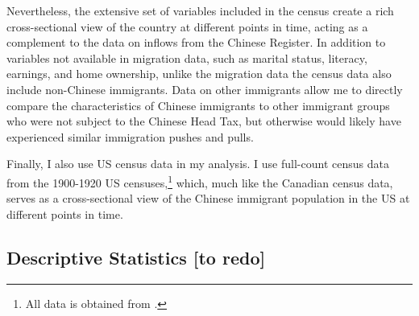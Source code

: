 Nevertheless, the extensive set of variables included in the census create a rich cross-sectional view of the country at different points in time, acting as a complement to the data on inflows from the Chinese Register. In addition to variables not available in migration data, such as marital status, literacy, earnings, and home ownership, unlike the migration data the census data also include non-Chinese immigrants. Data on other immigrants allow me to directly compare the characteristics of Chinese immigrants to other immigrant groups who were not subject to the Chinese Head Tax, but otherwise would likely have experienced similar immigration pushes and pulls.

Finally, I also use US census data in my analysis. I use full-count census data from the 1900-1920 US censuses,\footnote{All data is obtained from \citet{ipums}.} which, much like the Canadian census data, serves as a cross-sectional view of the Chinese immigrant population in the US at different points in time. 

\subsection{Descriptive Statistics [to redo]}

